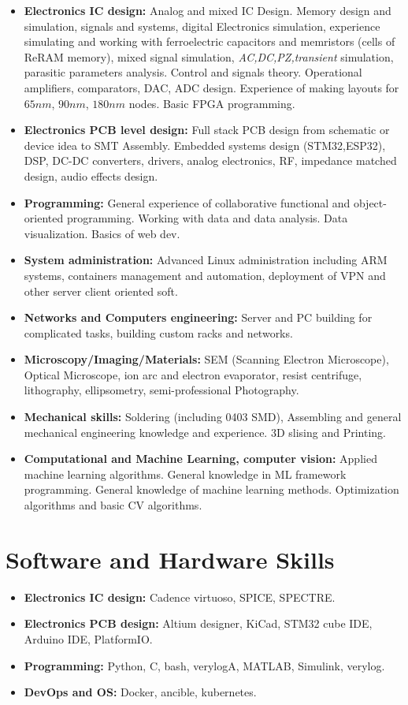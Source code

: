\documentclass{article}
\begin{document}
\begin{itemize}
\item \textbf{Electronics IC design:} Analog and mixed IC Design. Memory design and simulation, signals and systems, digital Electronics simulation, experience simulating and working with ferroelectric capacitors and memristors (cells of ReRAM memory),   mixed signal simulation, \textit{AC,DC,PZ,transient} simulation, parasitic parameters analysis. Control and signals theory. Operational amplifiers, comparators, DAC, ADC design. Experience of making layouts for $65 nm$, $90nm$, $180nm$ nodes. Basic FPGA programming.
\item \textbf{Electronics PCB level design:} Full stack PCB design from schematic or device idea to SMT Assembly. Embedded systems design (STM32,ESP32), DSP, DC-DC converters, drivers, analog electronics, RF, impedance matched design, audio effects design.
\item \textbf{Programming:} General experience of collaborative functional and object-oriented programming. Working with data and data analysis. Data visualization. Basics of web dev.
\item \textbf{System administration:} Advanced Linux administration including ARM systems, containers management and automation, deployment of VPN and other server client oriented soft.
\item \textbf{Networks and Computers engineering:} Server and PC building for complicated tasks, building custom racks and networks.
\item \textbf{Microscopy/Imaging/Materials:} SEM (Scanning Electron Microscope), Optical Microscope, ion arc and electron evaporator, resist centrifuge, lithography, ellipsometry, semi-professional Photography.
\item \textbf{Mechanical skills:} Soldering (including 0403 SMD), Assembling and general mechanical engineering knowledge and experience. 3D slising and Printing.
\item \textbf{Computational and Machine Learning, computer vision:} Applied machine learning algorithms. General knowledge in ML framework programming. General knowledge of machine learning methods. Optimization algorithms and basic CV algorithms.
\end{itemize}
 
\section{Software and Hardware Skills}
\begin{itemize}
\item \textbf{Electronics IC design:} Cadence virtuoso, SPICE, SPECTRE.
\item \textbf{Electronics PCB design:} Altium designer, KiCad, STM32 cube IDE, Arduino IDE, PlatformIO.
\item \textbf{Programming:} Python, C, bash, verylogA, MATLAB, Simulink, verylog.
\item \textbf{DevOps and OS:} Docker, ancible, kubernetes.
\end{itemize}
\end{document}
